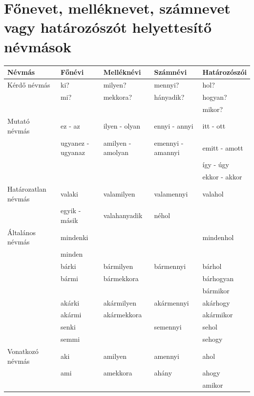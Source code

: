 \documentclass{article}
\begin{document}
\section{Főnevet, melléknevet, számnevet vagy határozószót helyettesítő névmások}
\begin{tabular}{|l|l|l|l|l|}
\hline
     Névmás & Főnévi & Melléknévi & Számnévi & Határozószói \\ \hline
     Kérdő névmás & ki? & milyen? & mennyi? & hol? \\
     & mi? & mekkora? & hányadik? & hogyan? \\ 
     & & & & mikor? \\ \hline
     Mutató névmás & ez - az & ilyen - olyan & ennyi - annyi & itt - ott \\
     & ugyanez - ugyanaz & amilyen - amolyan & emennyi - amannyi & emitt - amott \\ 
     & & & & így - úgy \\
     & & & & ekkor - akkor \\ \hline
     Határozatlan névmás & valaki & valamilyen & valamennyi & valahol \\
     & egyik - másik & valahanyadik & néhol & \\ \hline
     Általános névmás & mindenki & & & mindenhol \\ 
     & minden & & & \\
     & bárki & bármilyen & bármennyi & bárhol \\
     & bármi & bármekkora  &  & bárhogyan \\
     & & & & bármikor \\ 
     & akárki & akármilyen & akármennyi & akárhogy \\
     & akármi & akármekkora & & akármikor \\
     & senki & & semennyi & sehol \\
     & semmi & & & sehogy \\ \hline
     Vonatkozó névmás & aki & amilyen & amennyi & ahol \\
     & ami & amekkora & ahány & ahogy \\
     & & & & amikor \\ \hline
     
\end{tabular}
\end{document}
